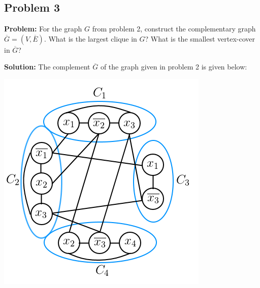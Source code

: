 \documentclass{article}
\begin{document}
\subsection*{Problem 3}
\noindent\textbf{Problem:} For the graph $G$ from problem 2, construct the complementary graph $\overline{G}=(V,\overline{E})$. What is the largest clique in $G$? What is the smallest vertex-cover in $\overline{G}$?
\bigskip

\noindent\textbf{Solution:} The complement $\overline{G}$ of the graph given in problem 2 is given below:
\begin{center}
  \includegraphics[scale=.8]{cover.png}
\end{center}
\end{document}

